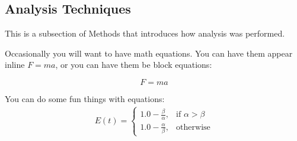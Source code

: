 \subsection{Analysis Techniques} \label{sec:analysis}
This is a subsection of Methods that introduces how analysis was performed.

Occasionally you will want to have math equations. You can have them
appear inline $F = ma$, or you can have them be block equations:

\begin{equation}
F = ma
\end{equation}

You can do some fun things with equations:
\begin{equation}
\begin{gathered}
E(t) =
\begin{cases}
      1.0-\frac{\beta}{\alpha},& \text{if } \alpha>\beta\\
      1.0-\frac{\alpha}{\beta},& \text{otherwise}
\end{cases}
\end{gathered}
\end{equation}
